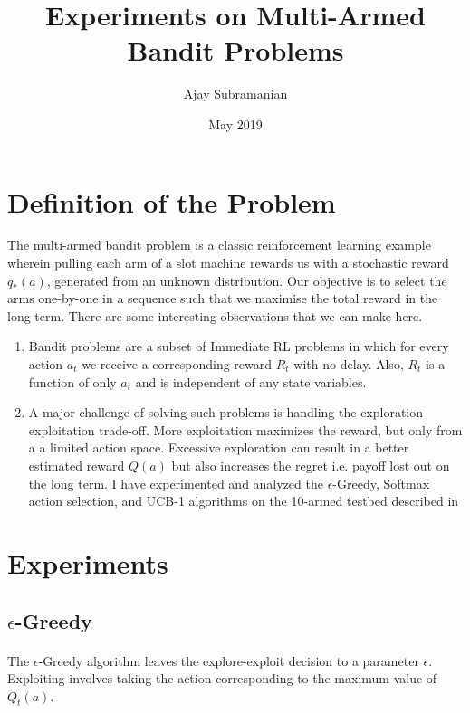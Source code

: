 \documentclass[12pt]{extarticle}
\title{Experiments on Multi-Armed Bandit Problems}
\author{Ajay Subramanian}
\date{May 2019}
\begin{document}
\maketitle

\setcounter{secnumdepth}{0}

\section{Definition of the Problem}
The multi-armed bandit problem is a classic reinforcement learning example wherein pulling each arm of a slot machine rewards us with a stochastic reward $q_*(a)$, generated from an unknown distribution. Our objective is to select the arms one-by-one in a sequence such that we maximise the total reward in the long term. There are some interesting observations that we can make here.

\begin{enumerate}
	\item Bandit problems are a subset of Immediate RL problems in which for every action $a_t$ we receive a corresponding reward $R_t$ with no delay. Also, $R_t$ is a function of only $a_t$ and is independent of any state variables.
	\item A major challenge of solving such problems is handling the exploration-exploitation trade-off. More exploitation maximizes the reward, but only from a a limited action space. Excessive exploration can result in a better estimated reward $Q(a)$ but also increases the regret i.e. payoff lost out on the long term.
I have experimented and analyzed the $\epsilon$-Greedy, Softmax action selection, and UCB-1 algorithms on the 10-armed testbed described in \cite{Sutton1998}
\end{enumerate}

\section{Experiments}

\subsection{$\epsilon$-Greedy}

\paragraph{} The $\epsilon$-Greedy algorithm leaves the explore-exploit decision to a parameter $\epsilon$. Exploiting involves taking the action corresponding to the maximum value of $Q_t(a)$.
\end{document}
